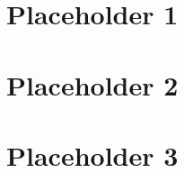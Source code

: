 









\tableofcontents
\newpage
\listoffigures
%


\chapter{Placeholder 1}


\chapter{Placeholder 2}


\chapter{Placeholder 3}



\renewcommand{\bibname}{References}



